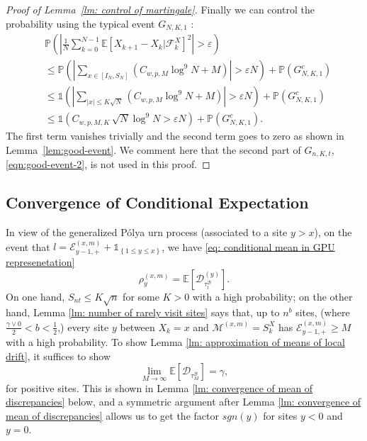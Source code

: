 \documentclass[twoside,12pt, a4paper, final]{article}
\numberwithin{equation}{section}
\theoremstyle{remark}
\newcommand{\comment}[1]{\textcolor{blue}{(Comment: #1)}}
\begin{document}
\begin{proof}[Proof of Lemma~\ref{lm: control of martingale}]
		Finally we can control the probability using the typical event $G_{N, K, 1}$ :
		\begin{align*}
			&\mathbb{P}\left( \left| \frac{1}{N} \sum_{k = 0}^{N-1} \mathbb{E}\left[ X_{k+1} - X_k | \mathcal{F}_k^X \right]^2  \right|  > \varepsilon \right)\\
			&\le \mathbb{P}\left( \left| \sum_{x \in \left[ I_N, S_N \right]} (C_{w, p, M} \log^9 N +M ) \right| > \varepsilon  N \right) + \mathbb{P}\left( G_{N, K, 1}^c \right)  \\
			&\le \mathbb{1}\left(  \left| \sum_{|x| \le K \sqrt{N} } (C_{w, p, M} \log^9 N +M ) \right| > \varepsilon  N  \right) + \mathbb{P}\left( G_{N, K, 1}^c \right)  \\
			&\le \mathbb{1}\left(  C_{w, p, M, K} \, \sqrt{N} \log^9 N > \varepsilon  N  \right) + \mathbb{P}\left( G_{N, K, 1}^c \right) 
			.\end{align*}
		The first term vanishes trivially and the second term goes to zero as shown in Lemma~\ref{lem:good-event}. 
		We comment here that the second part of $G_{n, K, t}$, \eqref{eqn:good-event-2}, is not used in this proof.
	\end{proof}
	
	
	
	\subsection{Convergence of Conditional Expectation}
	\label{sec:RhoGamma}
	In view of the generalized P\'{o}lya urn process (associated to a site $y> x$), 
	on the event that $l = \mathcal{E}^{(x,m)}_{y-1,+} +\mathbb{1}_{\left\{1\leq y\leq x\right\}}$, we have \eqref{eq: conditional mean in GPU represenetation} 
	$$\rho^{(x,m)}_y = \mathbb{E}\left[\mathcal{D}_{\tau_l^{\mathcal{B}}}^{(y)}\right].$$ 
	On one hand, $S_{nt} \leq K\sqrt{n} $ for some $K>0$ with a high probability; on the other hand, Lemma \ref{lm: number of rarely visit sites} says that, up to $n^b$ sites, (where $\frac{\gamma \vee 0}{2}<b<\frac{1}{2}$,) every site $y$ between $X_k=x$ and $\mathcal{M}^{(x,m)} =S_{k}^X$ has $ \mathcal{E}^{(x,m)}_{y-1,+} \geq M $ with a high probability. To show Lemma \ref{lm: approximation of means of local drift}, it suffices to show 
	\begin{equation}\label{eq: convergence of conditional expectation}
		\lim_{M\to\infty} \mathbb{E}[\mathcal{D}_{\tau_M^{\mathcal{B}}}] = \gamma , 
	\end{equation} for positive sites. This is shown in Lemma \ref{lm: convergence of mean of discrepancies} below, and a symmetric argument after Lemma \ref{lm: convergence of mean of discrepancies} allows us to get the factor $sgn(y)$ for sites $y<0$ and $y=0$.
	
\end{document}
